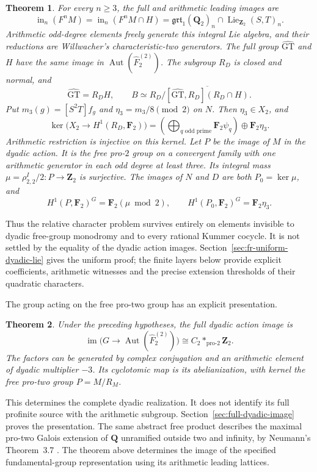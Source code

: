 \documentclass[11pt,a4paper]{article}
\newtheorem{theorem}{Theorem}[section]
\theoremstyle{definition}
\theoremstyle{remark}
\newcommand{\GT}{\widehat{\mathrm{GT}}}
\newcommand{\Z}{\mathbf Z}
\newcommand{\Q}{\mathbf Q}
\newcommand{\F}{\mathbf F}
\begin{document}
\begin{theorem}\label{thm:main-all-degree-dyadic}
For every $n\ge3$, the full and arithmetic leading images are
\[
 \operatorname{in}_n(F^nM)
 =\operatorname{in}_n(F^nM\cap H)
 =\mathfrak{grt}_1(\Q_2)_n
       \cap\operatorname{Lie}_{\Z_2}(S,T)_n.
\]
Arithmetic odd-degree elements freely generate this integral Lie
algebra, and their reductions are Willwacher's characteristic-two
generators. The full group $\GT$ and $H$ have the same image in
$\operatorname{Aut}(\widehat F_2^{(2)})$. The subgroup $R_D$ is
closed and normal, and
\[
 \GT=R_DH,\qquad
 B\simeq R_D/\overline{[\GT,R_D](R_D\cap H)}.
\]
Put $m_3(g)=[S^2T]f_g$ and $\eta_3=m_3/8\pmod2$ on $N$.
Then $\eta_3\in X_2$, and
\[
 \ker\bigl(X_2\longrightarrow H^1(R_D,\F_2)\bigr)
 =\left(\bigoplus_{q\text{ odd prime}}\F_2\psi_q\right)
                         \oplus\F_2\eta_3.
\]
Arithmetic restriction is injective on this kernel.
Let $P$ be the image of $M$ in the dyadic action. It is the free
pro-$2$ group on a convergent family with one arithmetic generator
in each odd degree at least three. Its integral mass
$\mu=\rho_{2,2}^I/2:P\to\Z_2$ is surjective. The images of $N$
and $D$ are both $P_0=\ker\mu$, and
\[
 H^1(P,\F_2)^G=\F_2(\mu\bmod2),\qquad
 H^1(P_0,\F_2)^G=\F_2\eta_3.
\]
\end{theorem}

Thus the relative character problem survives entirely on elements
invisible to dyadic free-group monodromy and to every rational
Kummer cocycle. It is not settled by the equality of the dyadic
action images. Section~\ref{sec:fr-uniform-dyadic-lie} gives the
uniform proof; the finite layers below provide explicit coefficients,
arithmetic witnesses and the precise extension thresholds of their
quadratic characters.

The group acting on the free pro-two group has an explicit presentation.

\begin{theorem}\label{thm:main-full-dyadic-image}
Under the preceding hypotheses, the full dyadic action image is
\[
 \operatorname{im}\bigl(G\to\operatorname{Aut}(\widehat F_2^{(2)})\bigr)
       \cong C_2*_{\mathrm{pro}\text{-}2}\mathbf Z_2.
\]
The factors can be generated by complex conjugation and an arithmetic
element of dyadic multiplier \(-3\). Its cyclotomic map is its
abelianization, with kernel the free pro-two group \(P=M/R_M\).
\end{theorem}

This determines the complete dyadic realization. It does not identify
its full profinite source with the arithmetic subgroup.
Section~\ref{sec:full-dyadic-image} proves the presentation.
The same abstract free product describes the maximal pro-two Galois
extension of \(\mathbf Q\) unramified outside two and infinity,
by Neumann's Theorem~3.7 \cite[p.~244]{Neumann1977}.
The theorem above determines the image of the specified fundamental-group
representation using its arithmetic leading lattices.
\end{document}
